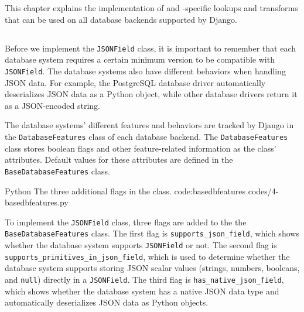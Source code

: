 \chapter{\babEmpat}

This chapter explains the implementation of  and
-specific lookups and transforms that can be used on all
database backends supported by Django.

\section{}

Before we implement the \verb|JSONField| class, it is important to remember
that each database system requires a certain minimum version to be compatible
with \verb|JSONField|. The database systems also have different behaviors when
handling JSON data. For example, the PostgreSQL database driver automatically
deserializes JSON data as a Python object, while other database drivers return
it as a JSON-encoded string.

The database systems' different features and behaviors are tracked by Django
in the \verb|DatabaseFeatures| class of each database backend. The
\verb|DatabaseFeatures| class stores boolean flags and other feature-related
information as the class' attributes. Default values for these attributes are
defined in the \verb|BaseDatabaseFeatures| class.

\listing
{Python}
{The three additional flags in the  class.}
{code:basedbfeatures}
{codes/4-basedbfeatures.py}

To implement the \verb|JSONField| class, three flags are added to the the
\verb|BaseDatabaseFeatures| class. The first flag is
\verb|supports_json_field|, which shows whether the database system supports
\verb|JSONField| or not. The second flag is
\verb|supports_primitives_in_json_field|, which is used to determine whether
the database system supports storing JSON scalar values (strings, numbers,
booleans, and \verb|null|) directly in a \verb|JSONField|. The third flag is
\verb|has_native_json_field|, which shows whether the database system has a
native JSON data type and automatically deserializes JSON data as Python
objects.


